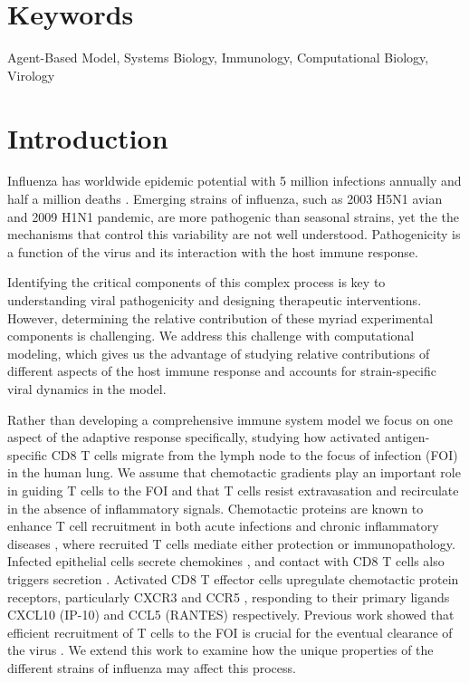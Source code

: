 \documentclass[10pt]{article}
\begin{document}

\section*{Keywords}

Agent-Based Model, Systems Biology, Immunology, Computational Biology, Virology


\section*{Introduction}

Influenza has worldwide epidemic potential with 5 million infections annually and half a million deaths \cite{Who2009}.  Emerging strains of influenza, such as 2003 H5N1 avian and 2009 H1N1 pandemic, are more pathogenic than seasonal strains, yet the the mechanisms that control this variability are not well understood.  Pathogenicity is a function of the virus and its interaction with the host immune response.

Identifying the critical components of this complex process is key to understanding viral pathogenicity and designing therapeutic interventions.  However, determining the relative contribution of these myriad experimental components is challenging. We address this challenge with computational modeling, which gives us the advantage of studying relative contributions of different aspects of the host immune response and accounts for strain-specific viral dynamics in the model.

Rather than developing a comprehensive immune system model we focus on one aspect of the adaptive response specifically, studying how activated antigen-specific CD8 T cells migrate from the lymph node to the focus of infection (FOI) in the human lung.  We assume that chemotactic gradients play an important role in guiding T cells to the FOI and that T cells resist extravasation and recirculate in the absence of inflammatory signals.  Chemotactic proteins are known to enhance T cell recruitment in both acute infections and chronic inflammatory diseases \cite{Bromley2008, Medoff2005, Castellino2006 ,Gunn1998, Okada2005}, where recruited T cells mediate either protection or immunopathology.  Infected epithelial cells secrete chemokines \cite{Chan2005}, and contact with CD8 T cells also triggers secretion \cite{Zhao2000}. Activated CD8 T effector cells upregulate chemotactic protein receptors, particularly CXCR3 and CCR5 \cite{Hoji2005, Groom2011a}, responding to their primary ligands CXCL10 (IP-10) and CCL5 (RANTES) respectively.  Previous work showed that efficient recruitment of T cells to the FOI is crucial for the eventual clearance of the virus \cite{Cerwenka1999, Kim2011}.  We extend this work to examine how the unique properties of the different strains of influenza may affect this process.
\end{document}
